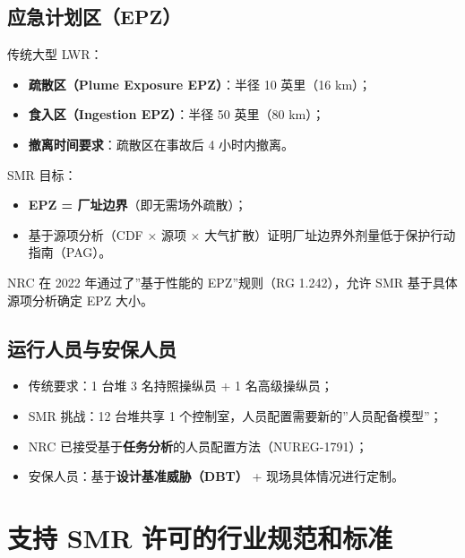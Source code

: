 \documentclass[
  UTF8,
  scheme=plain,
  fontsize=10pt,
  openany
]{ctexbook}
\begin{document}
\subsection{应急计划区（EPZ）}\label{ux5e94ux6025ux8ba1ux5212ux533aepz}

传统大型 LWR：

\begin{itemize}
\tightlist
\item
  \textbf{疏散区（Plume Exposure EPZ）}：半径 10 英里（16 km）；
\item
  \textbf{食入区（Ingestion EPZ）}：半径 50 英里（80 km）；
\item
  \textbf{撤离时间要求}：疏散区在事故后 4 小时内撤离。
\end{itemize}

SMR 目标：

\begin{itemize}
\tightlist
\item
  \textbf{EPZ = 厂址边界}（即无需场外疏散）；
\item
  基于源项分析（CDF × 源项 ×
  大气扩散）证明厂址边界外剂量低于保护行动指南（PAG）。
\end{itemize}

NRC 在 2022 年通过了''基于性能的 EPZ''规则（RG 1.242），允许 SMR
基于具体源项分析确定 EPZ 大小。

\subsection{运行人员与安保人员}\label{ux8fd0ux884cux4ebaux5458ux4e0eux5b89ux4fddux4ebaux5458}

\begin{itemize}
\tightlist
\item
  传统要求：1 台堆 3 名持照操纵员 + 1 名高级操纵员；
\item
  SMR 挑战：12 台堆共享 1 个控制室，人员配置需要新的''人员配备模型''；
\item
  NRC 已接受基于\textbf{任务分析}的人员配置方法（NUREG-1791）；
\item
  安保人员：基于\textbf{设计基准威胁（DBT）} + 现场具体情况进行定制。
\end{itemize}

\section{支持 SMR
许可的行业规范和标准}\label{ux652fux6301-smr-ux8bb8ux53efux7684ux884cux4e1aux89c4ux8303ux548cux6807ux51c6}
\end{document}
